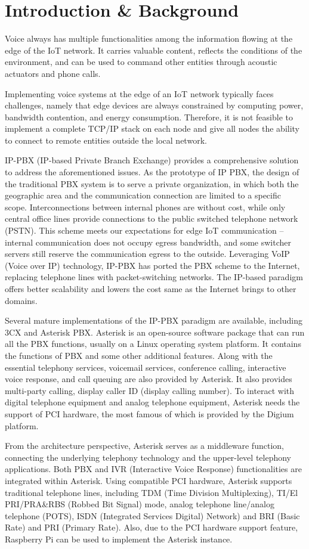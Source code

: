 \section{Introduction \& Background}	
\label{sec:introduction-background}
Voice always has multiple functionalities among the information flowing at the edge of the IoT network. It carries valuable content, reflects the conditions of the environment, and can be used to command other entities through acoustic actuators and phone calls.

Implementing voice systems at the edge of an IoT network typically faces challenges, namely that edge devices are always constrained by computing power, bandwidth contention, and energy consumption. Therefore, it is not feasible to implement a complete TCP/IP stack on each node and give all nodes the ability to connect to remote entities outside the local network.

IP-PBX (IP-based Private Branch Exchange) provides a comprehensive solution to address the aforementioned issues. As the prototype of IP PBX, the design of the traditional PBX system is to serve a private organization, in which both the geographic area and the communication connection are limited to a specific scope. Interconnections between internal phones are without cost, while only central office lines provide connections to the public switched telephone network (PSTN). This scheme meets our expectations for edge IoT communication -- internal communication does not occupy egress bandwidth, and some switcher servers still reserve the communication egress to the outside. Leveraging VoIP (Voice over IP) technology, IP-PBX has ported the PBX scheme to the Internet, replacing telephone lines with packet-switching networks. The IP-based paradigm offers better scalability and lowers the cost same as the Internet brings to other domains. 

Several mature implementations of the IP-PBX paradigm are available, including 3CX and Asterisk PBX. Asterisk is an open-source software package that can run all the PBX functions, usually on a Linux operating system platform. It contains the functions of PBX and some other additional features. Along with the essential telephony services, voicemail services, conference calling, interactive voice response, and call queuing are also provided by Asterisk. It also provides multi-party calling, display caller ID (display calling number). To interact with digital telephone equipment and analog telephone equipment, Asterisk needs the support of PCI hardware, the most famous of which is provided by the Digium platform. 

From the architecture perspective, Asterisk serves as a middleware function, connecting the underlying telephony technology and the upper-level telephony applications. Both PBX and IVR (Interactive Voice Response) functionalities are integrated within Asterisk. Using compatible PCI hardware, Asterisk supports traditional telephone lines, including TDM (Time Division Multiplexing), TI/El PRI/PRA\&RBS (Robbed Bit Signal) mode, analog telephone line/analog telephone (POTS), ISDN (Integrated Services Digital) Network) and BRI (Basic Rate) and PRI (Primary Rate). Also, due to the PCI hardware support feature, Raspberry Pi can be used to implement the Asterisk instance.